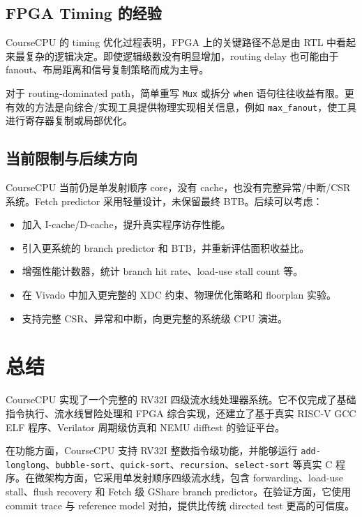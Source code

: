 \documentclass[UTF8,a4paper,12pt]{ctexrep}
\begin{document}
\section{FPGA Timing 的经验}

CourseCPU 的 timing 优化过程表明，FPGA 上的关键路径不总是由 RTL 中看起来最复杂的逻辑决定。即使逻辑级数没有明显增加，routing delay 也可能由于 fanout、布局距离和信号复制策略而成为主导。

对于 routing-dominated path，简单重写 \texttt{Mux} 或拆分 \texttt{when} 语句往往收益有限。更有效的方法是向综合/实现工具提供物理实现相关信息，例如 \texttt{max\_fanout}，使工具进行寄存器复制或局部优化。

\section{当前限制与后续方向}

CourseCPU 当前仍是单发射顺序 core，没有 cache，也没有完整异常/中断/CSR 系统。Fetch predictor 采用轻量设计，未保留最终 BTB。后续可以考虑：

\begin{itemize}
  \item 加入 I-cache/D-cache，提升真实程序访存性能。
  \item 引入更系统的 branch predictor 和 BTB，并重新评估面积收益比。
  \item 增强性能计数器，统计 branch hit rate、load-use stall count 等。
  \item 在 Vivado 中加入更完整的 XDC 约束、物理优化策略和 floorplan 实验。
  \item 支持完整 CSR、异常和中断，向更完整的系统级 CPU 演进。
\end{itemize}

\chapter{总结}

CourseCPU 实现了一个完整的 RV32I 四级流水线处理器系统。它不仅完成了基础指令执行、流水线冒险处理和 FPGA 综合实现，还建立了基于真实 RISC-V GCC ELF 程序、Verilator 周期级仿真和 NEMU difftest 的验证平台。

在功能方面，CourseCPU 支持 RV32I 整数指令级功能，并能够运行 \texttt{add-longlong}、\texttt{bubble-sort}、\texttt{quick-sort}、\texttt{recursion}、\texttt{select-sort} 等真实 C 程序。在微架构方面，它采用单发射顺序四级流水线，包含 forwarding、load-use stall、flush recovery 和 Fetch 级 GShare branch predictor。在验证方面，它使用 commit trace 与 reference model 对拍，提供比传统 directed test 更高的可信度。
\end{document}
